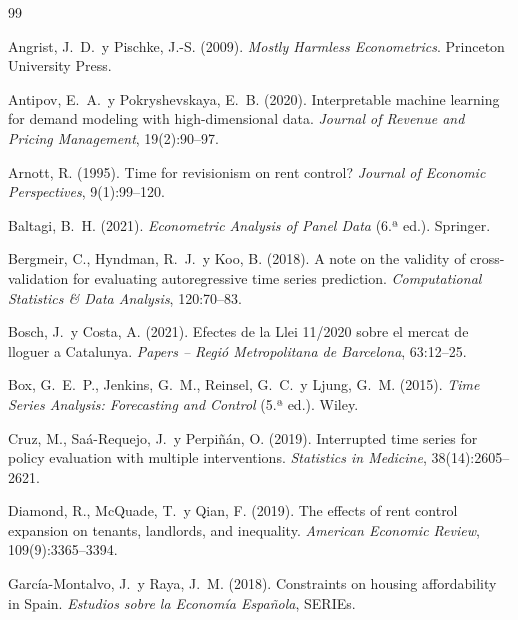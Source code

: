 \documentclass[10pt,a4paper,twocolumn]{article}
\begin{document}

\begin{thebibliography}{99}

Angrist, J.~D.\ y Pischke, J.-S. (2009).
\textit{Mostly Harmless Econometrics}.
Princeton University Press.

Antipov, E.~A.\ y Pokryshevskaya, E.~B. (2020).
Interpretable machine learning for demand modeling with high-dimensional data.
\textit{Journal of Revenue and Pricing Management}, 19(2):90--97.

Arnott, R. (1995).
Time for revisionism on rent control?
\textit{Journal of Economic Perspectives}, 9(1):99--120.

Baltagi, B.~H. (2021).
\textit{Econometric Analysis of Panel Data} (6.ª ed.).
Springer.

Bergmeir, C., Hyndman, R.~J.\ y Koo, B. (2018).
A note on the validity of cross-validation for evaluating autoregressive time
series prediction.
\textit{Computational Statistics \& Data Analysis}, 120:70--83.

Bosch, J.\ y Costa, A. (2021).
Efectes de la Llei 11/2020 sobre el mercat de lloguer a Catalunya.
\textit{Papers -- Regió Metropolitana de Barcelona}, 63:12--25.

Box, G.~E.~P., Jenkins, G.~M., Reinsel, G.~C.\ y Ljung, G.~M. (2015).
\textit{Time Series Analysis: Forecasting and Control} (5.ª ed.).
Wiley.

Cruz, M., Saá-Requejo, J.\ y Perpiñán, O. (2019).
Interrupted time series for policy evaluation with multiple interventions.
\textit{Statistics in Medicine}, 38(14):2605--2621.

Diamond, R., McQuade, T.\ y Qian, F. (2019).
The effects of rent control expansion on tenants, landlords, and inequality.
\textit{American Economic Review}, 109(9):3365--3394.

García-Montalvo, J.\ y Raya, J.~M. (2018).
Constraints on housing affordability in Spain.
\textit{Estudios sobre la Economía Española}, SERIEs.


\end{thebibliography}
\end{document}
